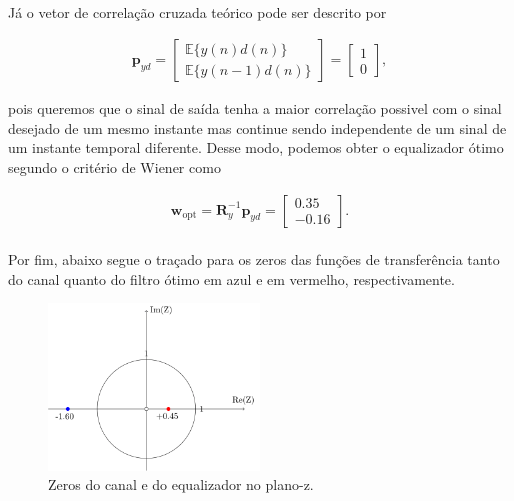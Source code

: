\documentclass[a4paper,10pt]{article}
\begin{document}
\begin{enumerate}
\begin{enumerate}
						\paragraph{}Já o vetor de correlação cruzada teórico pode ser descrito por
						
						\begin{align}
							\mathbf{p}_{yd} =
							\begin{bmatrix}
								\mathbb{E}\{y(n)d(n)\} \\
								\mathbb{E}\{y(n - 1)d(n)\}
							\end{bmatrix} = 
							\begin{bmatrix}
								1 \\
								0
							\end{bmatrix},
						\end{align}
						
						pois queremos que o sinal de saída tenha a maior correlação possivel com o sinal desejado de um mesmo instante mas continue sendo independente de um sinal de um instante temporal diferente.
						Desse modo, podemos obter o equalizador ótimo segundo o critério de Wiener como
						
						\begin{align}
							\mathbf{w}_{\text{opt}} = \mathbf{R}^{-1}_{y} \mathbf{p}_{yd} = \begin{bmatrix}
								0.35 \\
								-0.16
							\end{bmatrix}.
						\end{align}
						
						\paragraph{}Por fim, abaixo segue o traçado para os zeros das funções de transferência tanto do canal quanto do filtro ótimo em azul e em vermelho, respectivamente.
						
						\begin{figure}[H]
							\centering
							\includegraphics[width=0.5\textwidth]{figs/plano_z.png}
							\caption{Zeros do canal e do equalizador no plano-z.}
						\end{figure}
					

\end{enumerate}
\end{enumerate}
\end{document}
